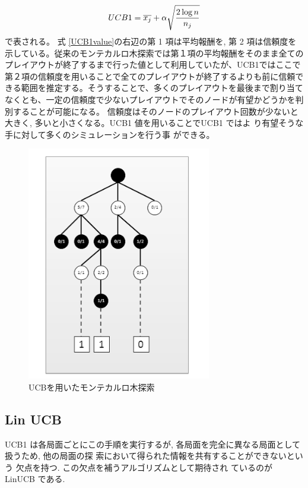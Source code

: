 \begin{equation}
\label{UCB1value}
\Large UCB1 = \overline {x_{j}}+\alpha \sqrt {\displaystyle \frac {2\log{n}} {n_{j}}}
\end{equation}
で表される。
式 \ref{UCB1value}の右辺の第 1 項は平均報酬を, 第 2 項は信頼度を示している。従来のモンテカルロ木探索では第１項の平均報酬をそのまま全てのプレイアウトが終了するまで行った値として利用していたが、UCB1ではここで第２項の信頼度を用いることで全てのプレイアウトが終了するよりも前に信頼できる範囲を推定する。そうすることで、多くのプレイアウトを最後まで割り当てなくとも、一定の信頼度で少ないプレイアウトでそのノードが有望かどうかを判別することが可能になる。
信頼度はそのノードのプレイアウト回数が少ないと大きく, 多いと小さくなる。UCB1 値を用いることでUCB1 ではよ り有望そうな手に対して多くのシミュレーションを行う事 ができる。

\begin{figure}
 \centering
 \includegraphics[keepaspectratio, scale=1.0,bb=0 0 304 387]
      {img/UCB.png}
 \caption{UCBを用いたモンテカルロ木探索}
 \label{monte2}
\end{figure}

\subsection{Lin UCB}
UCB1 は各局面ごとにこの手順を実行するが, 各局面を完全に異なる局面として扱うため, 他の局面の探 索において得られた情報を共有することができないという 欠点を持つ. この欠点を補うアルゴリズムとして期待され ているのが LinUCB である.

